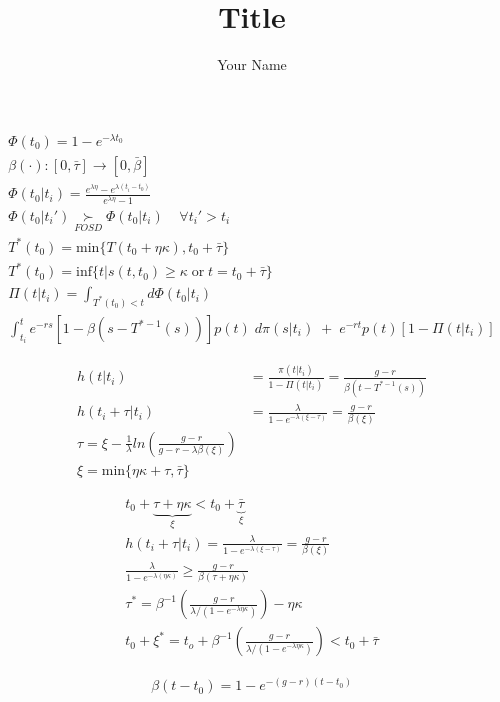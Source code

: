 \documentclass[14pt]{article}
\title{Title}
\author{Your Name}
\begin{document}
\begin{align*}
\Phi(t_0) = 1 - e^{- \lambda t_0} \\
\beta (\cdot) : [0, \bar\tau] \rightarrow [0, \bar\beta] \\
\Phi(t_0|t_i) = \frac{e^{\lambda \eta} - e^{\lambda(t_i - t_0)}}{e^{\lambda \eta} - 1} \\
\Phi(t_0|t_i') \underset{FOSD}{\succ} \Phi(t_0|t_i) \;\;\;\; \forall t_i' > t_i \\
T^*(t_0) = \text{min}\{T(t_0 + \eta \kappa), t_0 + \bar\tau\} \\
T^*(t_0) = \text{inf}\{t | s(t, t_0) \ge \kappa \; \text{or} \; t = t_0 + \bar\tau\} \\
\Pi (t | t_i) = \int_{T^*(t_0) < t} d\Phi(t_0|t_i) \\
\int_{t_i}^{t} e^{-rs} [1 - \beta(s - T^{*-1}(s))] p(t) \; d\pi(s|t_i) \; + \; e^{-rt}p(t)[1-\Pi(t|t_i)]
\end{align*}

\begin{align*}
h(t|t_i) &= \frac{\pi(t|t_i)}{1 - \Pi(t|t_i)} = \frac{g-r}{\beta(t - T^{*-1}(s))} \\
h(t_i + \tau |t_i)&= \frac{\lambda}{1 - e^{-\lambda(\xi - \tau)}} = \frac{g-r}{\beta(\xi)} \\
\tau = \xi - \frac{1}{\lambda} ln \left( \frac{g-r}{g-r-\lambda\beta(\xi)} \right) \\
\xi = \text{min}\{\eta\kappa + \tau , \bar\tau \}
\end{align*}

\begin{align*}
t_0 + \underbrace{\tau + \eta \kappa}_{\xi} < t_0 +  \underbrace{\bar\tau}_{\xi} \\
h(t_i + \tau| t_i) = \frac{\lambda}{1-e^{-\lambda(\xi-\tau)}} = \frac{g-r}{\beta(\xi)} \\
\frac{\lambda}{1-e^{-\lambda(\eta\kappa)}} \ge \frac{g-r}{\beta(\tau + \eta\kappa)} \\
\tau^* = \beta^{-1} \left( \frac{g-r}{\lambda/(1-e^{-\lambda\eta\kappa})} \right) - \eta\kappa \\
t_0 + \xi^* = t_o + \beta^{-1}\left( \frac{g-r}{\lambda/(1-e^{-\lambda\eta\kappa})}  \right) < t_0 + \bar\tau
\end{align*}


\begin{align*}
\beta (t -t_0) = 1 - e^{-(g-r)(t-t_0)}
\end{align*}
\end{document}
